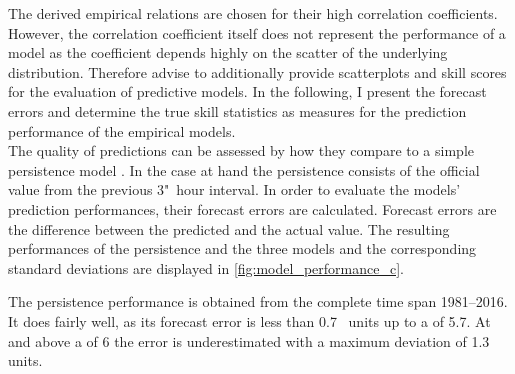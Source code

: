 The derived empirical relations are chosen for their high correlation coefficients. However, the correlation coefficient itself does not represent the performance of a model as the coefficient depends highly on the scatter of the underlying distribution. Therefore \citet{Wing2005} advise to additionally provide scatterplots and skill scores for the evaluation of predictive models. In the following, I present the forecast errors and determine the true skill statistics as measures for the prediction performance of the empirical models.\\

The quality of predictions can be assessed by how they compare to a simple persistence model \citep{Detman1999}. In the case at hand the persistence consists of the official \Kp{} value from the previous 3"~hour interval.
In order to evaluate the models' prediction performances, their forecast errors are calculated. Forecast errors are the difference between the predicted and the actual value. The resulting performances of the persistence and the three models and the corresponding standard deviations are displayed in \autoref{fig:model_performance_c}.
\begin{figure}
\end{figure}
The persistence performance is obtained from the complete \Kp{} time span 1981--2016. It does fairly well, as its forecast error is less than 0.7~\Kp{} units up to a \Kp{} of 5.7. At and above a \Kp{} of 6 the error is underestimated with a maximum deviation of 1.3~\Kp{} units.

